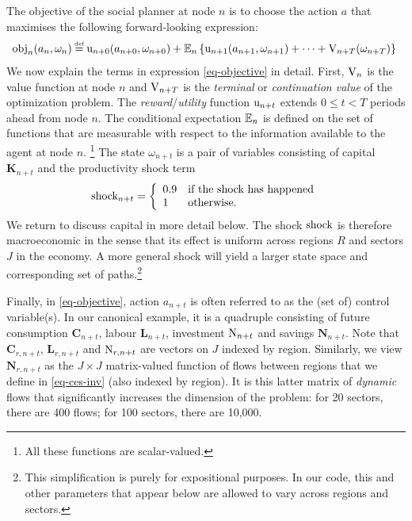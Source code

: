 \documentclass[12pt,a4paper,twoside, draft]{article}
\begin{document}
The objective of the social planner at node $n$ is to choose the action $a$
that maximises the following forward-looking expression:
\begin{align}\label{eq-objective}
\hskip-3pt   \textup{obj}_{n}(a_{n}, \omega_{n}) \defeq
   \textup{u}_{n + 0}(a_{n + 0}, \omega_{n + 0})
    + \mbb{E}_{n}\left\{
      \textup{u}_{n + 1}(a_{n + 1}, \omega_{n + 1}) + \cdots
      + \textup{V}_{n + T}(\omega_{n + T})
    \right\}
\end{align}
We now explain the terms in expression \eqref{eq-objective} in detail.
First, $\textup{V}_{n}$ is the value function at node $n$ and
$\textup{V}_{n + T}$ is the \emph{terminal} or \emph{continuation value} of the
optimization problem.
The \emph{reward}/\emph{utility} function $\textup{u}_{n + t}$ extends
$0 \leq t < T$ periods ahead from node $n$.
The conditional expectation $\mathbb{E}_{n}$ is defined on the set of functions
that are measurable with respect to the information available to the agent at 
node $n$.
\footnote{
   All these functions are scalar-valued.
}
The state $\omega_{n + t} $ is a pair of variables consisting  of capital
$\mathbf{K}_{n + t}$ and the productivity shock term
\begin{equation}
   \textup{shock}_{n + t} = \left\{
      \begin{array}{ll}
         0.9 & \textup{if the shock has happened}\\
         1 & \textup{otherwise.}
      \end{array}\right.
\end{equation}
We return to discuss capital in more detail below.
The shock $\textup{shock}$ is therefore macroeconomic in the sense that
its effect is uniform across regions $R$ and sectors $J$ in the economy.
A more general shock will yield a larger state space and corresponding set of
paths.\footnote{
   This simplification is purely for expositional purposes.
   In our code, this and other parameters that appear below are allowed to vary 
   across regions and sectors.
}

Finally, in \eqref{eq-objective}, action $a_{n + t}$ is often referred to as
the (set of) control variable(s).
In our canonical example, it is a quadruple consisting of future consumption
$\mathbf{C}_{n + t}$, labour $\mathbf{L}_{n + t}$, investment
$\textup{N}_{n + t}$ and savings $\mathbf{N}_{n + t}$.
Note that $\mathbf{C}_{r, n + t}$, $\mathbf{L}_{r, n + t}$ and
$\textup{N}_{r, n + t}$ are vectors on $J$ indexed by region.
Similarly, we view $\mathbf{N}_{r, n + t}$ as the $J\times J$ matrix-valued
function of flows between regions that we define in \eqref{eq-ces-inv} (also
indexed by region).
It is this latter matrix of \emph{dynamic} flows that significantly increases
the dimension of the problem: for 20 sectors, there are 400 flows; for 100
sectors, there are 10,000.
\end{document}
